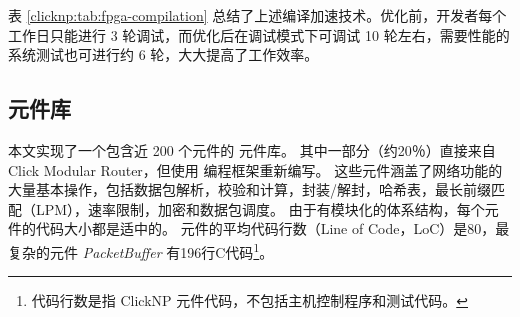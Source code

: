 表 \ref{clicknp:tab:fpga-compilation} 总结了上述编译加速技术。优化前，开发者每个工作日只能进行 3 轮调试，而优化后在调试模式下可调试 10 轮左右，需要性能的系统测试也可进行约 6 轮，大大提高了工作效率。


\subsection{\name 元件库}
\label{clicknp:subsec:lib}

本文实现了一个包含近 200 个元件的 \name{} 元件库。
其中一部分（约20％）直接来自Click Modular Router，但使用 \name{} 编程框架重新编写。
这些元件涵盖了网络功能的大量基本操作，包括数据包解析，校验和计算，封装/解封，哈希表，最长前缀匹配（LPM），速率限制，加密和数据包调度。
由于\name 有模块化的体系结构，每个元件的代码大小都是适中的。
元件的平均代码行数（Line of Code，LoC）是80，最复杂的元件 \textit {PacketBuffer} 有196行C代码\footnote{代码行数是指 ClickNP 元件代码，不包括主机控制程序和测试代码。}。


